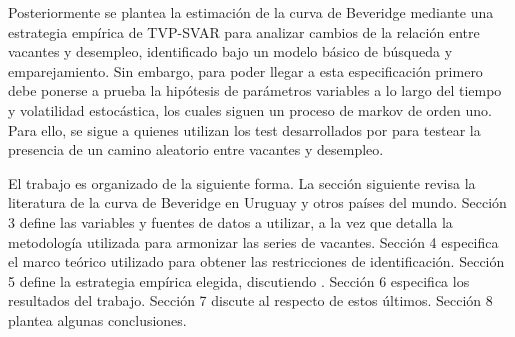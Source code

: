 Posteriormente se plantea la estimación de la curva de Beveridge mediante una estrategia empírica de TVP-SVAR para analizar cambios de la relación entre vacantes y desempleo, identificado bajo un modelo básico de búsqueda y emparejamiento. Sin embargo, para poder llegar a esta especificación primero debe ponerse a prueba la hipótesis de parámetros variables a lo largo del tiempo y volatilidad estocástica, los cuales siguen un proceso de markov de orden uno. Para ello, se sigue a \cite{Benati2013} quienes utilizan los test desarrollados por \cite{Stock1996, Stock1998} para testear la presencia de un camino aleatorio entre vacantes y desempleo.

El trabajo es organizado de la siguiente forma. La sección siguiente revisa la literatura de la curva de Beveridge en Uruguay y otros países del mundo. Sección 3 define las variables y fuentes de datos a utilizar, a la vez que detalla la metodología utilizada para armonizar las series de vacantes. Sección 4 especifica el marco teórico utilizado para obtener las restricciones de identificación. Sección 5 define la estrategia empírica elegida, discutiendo . Sección 6 especifica los resultados del trabajo. Sección 7 discute al respecto de estos últimos. Sección 8 plantea algunas conclusiones.

